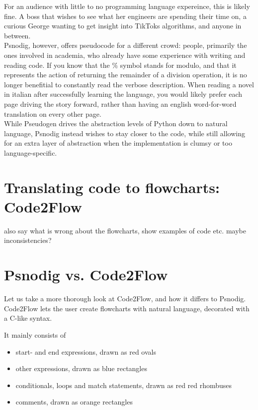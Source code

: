 For an audience with little to no programming language expereince, this is likely fine. A boss that wishes to see what her engineers are spending their time on, a curious George wanting to get insight into TikToks algorithms, and anyone in between. \hfill \\

Psnodig, however, offers pseudocode for a different crowd: people, primarily the ones involved in academia, who already have some experience with writing and reading code. If you know that the \% symbol stands for modulo, and that it represents the action of returning the remainder of a division operation, it is no longer benefitial to constantly read the verbose description. When reading a novel in italian after successfully learning the language, you would likely prefer each page driving the story forward, rather than having an english word-for-word translation on every other page. \hfill \\

While Pseudogen drives the abstraction levels of Python down to natural language, Psnodig instead wishes to stay closer to the code, while still allowing for an extra layer of abstraction when the implementation is clumsy or too language-specific.

\section{Translating code to flowcharts: Code2Flow}

also say what is wrong about the flowcharts, show examples of code etc. maybe inconsistencies?

\section{Psnodig vs. Code2Flow}

Let us take a more thorough look at Code2Flow, and how it differs to Psnodig. Code2Flow lets the user create flowcharts with natural language, decorated with a C-like syntax.

It mainly consists of

\begin{itemize}
    \item start- and end expressions, drawn as red ovals
    \item other expressions, drawn as blue rectangles
    \item conditionals, loops and match statements, drawn as red red rhombuses
    \item comments, drawn as orange rectangles
\end{itemize}

